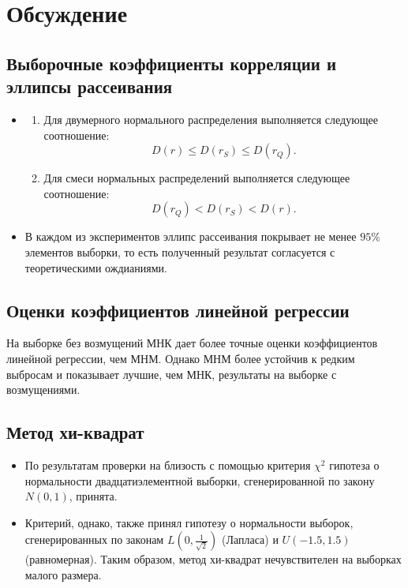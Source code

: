 \documentclass[a4paper]{article}
\begin{document}
\section{Обсуждение}
\subsection{Выборочные коэффициенты корреляции и эллипсы рассеивания}
\begin{itemize}
    \item \begin{enumerate}
    \item Для двумерного нормального распределения выполняется следующее соотношение:
    \begin{equation*}
        D(r)\leq D(r_S) \leq D(r_Q).
    \end{equation*}
    \item Для смеси нормальных распределений выполняется следующее соотношение:
    \begin{equation*}
        D(r_Q)< D(r_S)< D(r).
    \end{equation*}
\end{enumerate}
\item В каждом из экспериментов эллипс рассеивания покрывает не менее $95\%$ элементов выборки, то есть полученный результат согласуется с теоретическими ождианиями.  
\end{itemize}
\subsection{Оценки коэффициентов линейной регрессии}
На выборке без возмущений МНК дает более точные оценки коэффициентов линейной регрессии, чем МНМ. Однако МНМ более устойчив к редким выбросам и показывает лучшие, чем МНК, результаты на выборке с возмущениями.
\subsection{Метод хи-квадрат}
\begin{itemize}
    \item По результатам проверки на близость с помощью критерия $\chi^2$ гипотеза о нормальности двадцатиэлементной выборки, сгенерированной по закону $N(0,1)$, принята.
    \item Критерий, однако, также принял гипотезу о нормальности выборок, сгенерированных по законам $L(0,\frac{1}{\sqrt{2}})$ (Лапласа) и $U(-1.5,1.5)$ (равномерная). Таким образом, метод хи-квадрат нечувствителен на выборках малого размера.
\end{itemize}
\end{document}
